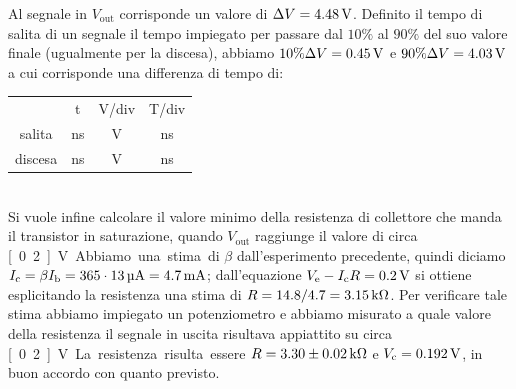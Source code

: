 \documentclass[italian,a4paper]{article}
\begin{document}
Al segnale in $V_{\text{out}}$ corrisponde un valore di
$\Delta V = \unit[4.48]{V}$. Definito il tempo di salita di un segnale
il tempo impiegato per passare dal $10 \%$ al $90 \%$ del suo valore
finale (ugualmente per la discesa), abbiamo $10 \% \Delta V =
\unit[0.45]{V}$ e $90\% \Delta V = \unit[4.03]{V}$ a cui corrisponde una
differenza di tempo di:
\begin{table}[h]
    \centering
    \begin{tabular}{*4c}
        &  t & V/div & T/div\\
        salita & \unit[1740]{ns} & \unit[1] {V} & \unit[500]{ns}\\
    discesa & \unit[2720]{ns} & \unit[1]{V} & \unit[500]{ns}\\
\end{tabular} \end{table}\\

Si vuole infine calcolare il valore minimo della resistenza di collettore
che manda il transistor in saturazione, quando $V_{\text{out}}$
raggiunge il valore di circa \unit[0.2]{V}.  Abbiamo una stima
di $\beta$ dall'esperimento precedente, quindi diciamo $I_{\text{c}}=
\beta I_{\text{b}}= 365 \cdot \unit[13]{\micro A}= \unit[4.7]{mA}$;
dall'equazione $V_{\text{e}} - I_{\text{c}}R = \unit[0.2]{V}$ si
ottiene esplicitando la resistenza una stima di $R = {14.8}/{4.7}=
\unit[3.15]{k\ohm}$. Per verificare tale stima abbiamo impiegato un
potenziometro e abbiamo misurato a quale valore della resistenza il segnale
in uscita risultava appiattito su circa \unit[0.2]{V}. La resistenza risulta
essere $R =\unit[3.30\pm0.02]{k\ohm} $ e $V_{\text{c}}= \unit[0.192]{V}$, in buon
accordo con quanto previsto.
\end{document}
